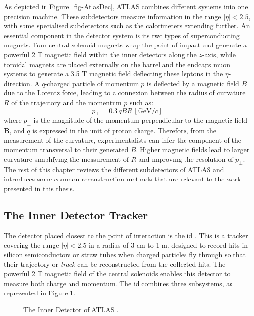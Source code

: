 As depicted in Figure~\ref{fig-AtlasDec}, ATLAS combines different systems into one precision machine. These subdetectors measure information in the range $|\eta|<  2.5$, with some specialised subdetectors such as the calorimeters extending further. An essential component in the detector system is its two types of superconducting magnets. Four central solenoid magnets wrap the point of impact and generate a powerful 2 T magnetic field within the inner detectors along the $z$-axis, while toroidal magnets are placed externally on the barrel and the endcaps muon systems to generate a 3.5 T magnetic field deflecting these leptons in the $\eta$-direction. A $q$-charged particle of momentum $p$ is deflected by a magnetic field $B$ due to the Lorentz force, leading to a connexion between the radius of curvature $R$ of the trajectory and the momentum $p$ such as: 
\begin{equation}
  p_{\perp} = 0.3 \, qBR \, [\text{GeV}/c]
\end{equation}
where $p_{\perp}$ is the magnitude of the momentum perpendicular to the magnetic field $\boldsymbol{B}$, and $q$ is expressed in the unit of proton charge. Therefore, from the measurement of the curvature, experimentalists can infer the component of the momentum transversal to their generated $B$. Higher magnetic fields lead to larger curvature simplifying the measurement of $R$ and improving the resolution of $p_{\perp}$. \\ 

The rest of this chapter reviews the different subdetectors of ATLAS and introduces some common reconstruction methods that are relevant to the work presented in this thesis. 

\subsection{The Inner Detector Tracker}
The detector placed closest to the point of interaction is the \gls{id} \cite{CERN-LHCC-97-016}. This is a tracker covering the range $|\eta| < 2.5$ in a radius of 3 cm to 1 m, designed to record hits in silicon semiconductors or straw tubes when charged particles fly through so that their trajectory or \textit{track} can be reconstructed from the collected hits. The powerful 2 T magnetic field of the central solenoids enables this detector to measure both charge and momentum. The \gls{id} combines three subsystems, as represented in Figure \ref{fig-AtlasDecID}. 

\begin{figure}[!h]
  \centering
  \hspace{-1.25cm}
  \caption{The Inner Detector of ATLAS \cite{ATLASschematics}.}
  \label{fig-AtlasDecID}
\end{figure}

